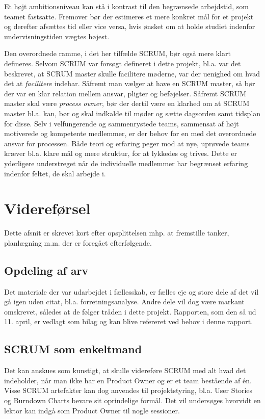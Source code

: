 Et højt ambitionsniveau kan stå i kontrast til den begrænsede arbejdstid, som teamet fastsatte. Fremover bør der estimeres et mere konkret mål for et projekt og derefter afsættes tid eller vice versa, hvis ønsket om at holde studiet indenfor undervisningstiden vægtes højest.

Den overordnede ramme, i det her tilfælde SCRUM, bør også mere klart defineres. 
Selvom SCRUM var forsøgt defineret i dette projekt, bl.a. var det beskrevet, at SCRUM master skulle facilitere møderne, var der uenighed om hvad det at \emph{facilitere} indebar. 
Såfremt man vælger at have en SCRUM master, så bør der var en klar relation mellem ansvar, pligter og beføjelser. Såfremt SCRUM master skal være \emph{process owner}, bør der dertil være en klarhed om at SCRUM master bl.a. kan, bør og skal indkalde til møder og sætte dagsorden samt tidsplan for disse. Selv i velfungerende og sammenrystede teams, sammensat af højt motiverede og kompetente medlemmer, er der behov for en med det overordnede ansvar for processen. Både teori og erfaring peger mod at nye, uprøvede teams \cite{mit-newteams} kræver bl.a. klare mål og mere struktur, for at lykkedes og trives. Dette er yderligere understreget når de individuelle medlemmer har begrænset erfaring indenfor feltet, de skal arbejde i.

\section{Videreførsel}
Dette afsnit er skrevet kort efter opsplittelsen mhp. at fremstille tanker, planlægning m.m. der er foregået efterfølgende. 

\subsection{Opdeling af arv}
Det materiale der var udarbejdet i fællesskab, er fælles eje og store dele af det vil gå igen uden citat, bl.a. forretningsanalyse. Andre dele vil dog være markant omskrevet, således at de følger tråden i dette projekt. Rapporten, som den så ud 11. april, er vedlagt som bilag og kan blive refereret ved behov i denne rapport.

\subsection{SCRUM som enkeltmand}
Det kan anskues som kunstigt, at skulle videreføre SCRUM med alt hvad det indeholder, når man ikke har en Product Owner og er et team bestående af én. Visse SCRUM artefakter kan dog anvendes til projektstyring, bl.a. User Stories og Burndown Charts bevare sit oprindelige formål. Det vil undersøges hvorvidt en lektor kan indgå som Product Owner til nogle sessioner.

